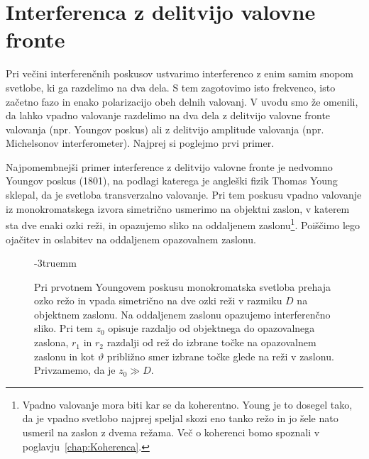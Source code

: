 \section{Interferenca z delitvijo valovne fronte}
Pri večini interferenčnih poskusov ustvarimo interferenco z enim samim 
snopom svetlobe, ki ga razdelimo na dva dela. S tem zagotovimo isto 
frekvenco, isto začetno fazo in enako polarizacijo obeh delnih valovanj. V uvodu smo
že omenili, da lahko vpadno valovanje razdelimo na dva dela z delitvijo 
valovne fronte valovanja (npr. Youngov poskus) ali z delitvijo amplitude
valovanja (npr. Michelsonov interferometer). Najprej si poglejmo prvi primer.

Najpomembnejši primer interference z delitvijo valovne fronte je nedvomno
Youngov poskus (1801), na podlagi katerega je angleški fizik Thomas Young
sklepal, da je svetloba transverzalno valovanje. 
Pri tem poskusu vpadno valovanje iz monokromatskega izvora  
simetrično usmerimo na objektni zaslon, v katerem sta dve enaki ozki
reži, in opazujemo sliko na oddaljenem zaslonu\footnote{Vpadno valovanje mora biti 
kar se da koherentno. Young je to dosegel tako, da je vpadno svetlobo najprej 
speljal skozi eno tanko režo in jo šele nato usmeril na zaslon z dvema režama. 
Več o koherenci bomo spoznali v poglavju~\ref{chap:Koherenca}.}. Poiščimo 
lego ojačitev in oslabitev na oddaljenem opazovalnem zaslonu.
\begin{figure}[ht]
\centering
\def\svgwidth{100truemm} 

\caption{Pri prvotnem Youngovem poskusu monokromatska svetloba prehaja ozko 
režo in vpada simetrično na dve ozki reži v razmiku $D$ na objektnem zaslonu. 
Na oddaljenem zaslonu opazujemo interferenčno sliko. Pri tem $z_0$ opisuje razdaljo
od objektnega do opazovalnega zaslona, $r_1$ in 
$r_2$ razdalji od rež do izbrane točke na opazovalnem zaslonu in kot 
$\vartheta$ približno smer izbrane točke glede na reži v zaslonu. 
Privzamemo, da je $z_0 \gg D$.}
\label{fig:06_Young}
\vglue-3truemm
\end{figure}

